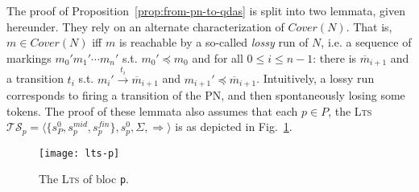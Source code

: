 \documentclass[runningheads,oribibl,]{article}
\newcommand{\mleq}{\preceq}
\newcommand{\tuple}[1]{\langle#1\rangle\xspace}
\newcommand{\Ts}{\ensuremath{\mathcal{TS}}\xspace}
\newcommand{\mbar}{\ensuremath{\overline{m}}\xspace}
\newcommand{\lts}{\textsc{Lts}\xspace}
\newcommand{\Cover}{\ensuremath{\textit{Cover}}}
\begin{document}
\propfrompntoqdas*

The proof of Proposition~\ref{prop:from-pn-to-qdas} is split into two
lemmata, given hereunder. They rely on an alternate characterization of
$\Cover(N)$. That is, $m\in\Cover(N)$ iff $m$ is reachable by a
so-called \emph{lossy} run of $N$, i.e. a sequence of markings
$m_0'm_1'\cdots m_n'$ s.t. $m_0'\mleq m_0$ and for all $0\leq i\leq
n-1$: there is $\mbar_{i+1}$ and a transition $t_i$
s.t. $m_i'\xrightarrow{t_i}\mbar_{i+1}$ and
$m_{i+1}'\mleq\mbar_{i+1}$. Intuitively, a lossy run corresponds to
firing a transition of the PN, and then spontaneously losing some
tokens. The proof of these lemmata also assumes that each $p\in P$,
the \lts $\Ts_p=\tuple{\{s^0_P, s^{mid}_p,s^{fin}_p\}, s^0_p,
  \Sigma,\Rightarrow}$ is as depicted in Fig.~\ref{fig:lts-p}.

\begin{figure}
  \centering
  \texttt{[image: lts-p]}
  \caption{The \lts of bloc {\tt p}.}
  \label{fig:lts-p}
\end{figure}
\end{document}
